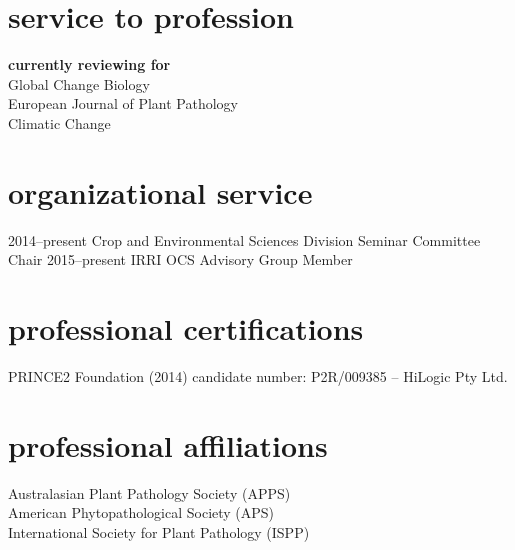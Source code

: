         \section*{service to profession}
        \textbf{currently reviewing for}\\
        Global Change Biology\\
        European Journal of Plant Pathology\\
        Climatic Change\\
        
      \section*{organizational service}
        \begin{entrylist}
          \entry
        	{2014--present}
        	{Crop and Environmental Sciences Division Seminar Committee Chair}
        	{}
        	{}
	      \entry  
	        {2015--present}
        	{IRRI OCS Advisory Group Member}
        	{}
        	{}
        \end{entrylist}
        \section*{professional certifications}
        PRINCE2 Foundation (2014) candidate number: P2R/009385 – HiLogic  Pty Ltd.
        
        \section*{professional affiliations}
        Australasian Plant Pathology Society (APPS)\\
        American Phytopathological Society (APS)\\
        International Society for Plant Pathology (ISPP)\\
